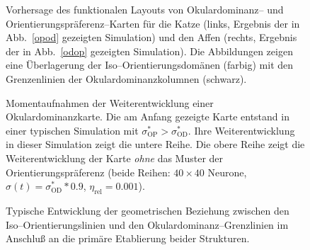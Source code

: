 \begin{figure}[t]
    \centering
    \begin{minipage}[t]{6.2cm}
    \end{minipage}
    \hskip0.4cm
    \begin{minipage}[t]{6.2cm}
    \end{minipage}
    \caption{Vorhersage des funktionalen Layouts von Okulardominanz-- und
    Orientierungspräferenz--Karten für die Katze (links, Ergebnis der in
    Abb.~\ref{opod} gezeigten Simulation) und den Affen (rechts, Ergebnis der
    in Abb.~\ref{odop} gezeigten Simulation). Die Abbildungen zeigen eine
    Überlagerung der Iso--Orientierungsdomänen (farbig) mit den Grenzenlinien
    der Okulardominanzkolumnen (schwarz).}
    \label{simres}
\end{figure}

\begin{figure}[p]
    \centering
    \begin{sideways}
    \end{sideways}
    \caption{Momentaufnahmen der Weiterentwicklung einer Okulardominanzkarte.
    Die am Anfang gezeigte Karte entstand in einer typischen Simulation mit
        $\sigma^\ast_{\text{OP}}>\sigma^\ast_{\text{OD}}$. Ihre Weiterentwicklung in
        dieser Simulation zeigt die untere Reihe. Die obere Reihe zeigt die
        Weiterentwicklung der Karte \emph{ohne} das Muster der
        Orientierungspräferenz (beide Reihen: $40\times 40$ Neurone,
        $\sigma(t)=\sigma^\ast_{\text{OD}}*0.9$, $\eta_{\text{rel}}=0.001$).}
    \label{oddev}

    \begin{center}
        \begin{sideways}
        \end{sideways}
    \end{center}
    \caption{Typische Entwicklung der geometrischen Beziehung zwischen den
    Iso--Orientierungslinien und den Okulardominanz--Grenzlinien im Anschluß
    an die primäre Etablierung beider Strukturen.}
    \label{angledev}
\end{figure}

